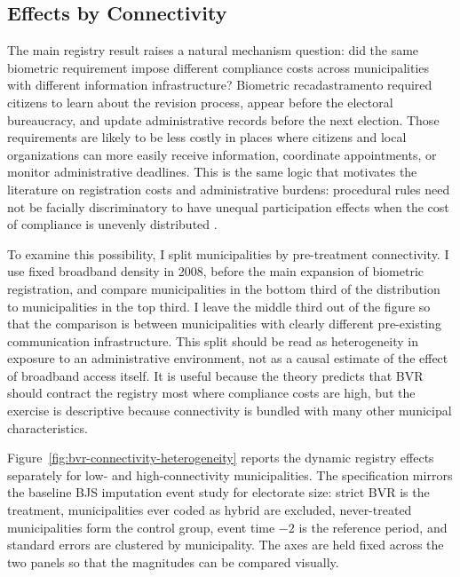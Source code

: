 \subsection{Effects by Connectivity}
\label{ssec:connectivity-heterogeneity}

The main registry result raises a natural mechanism question: did the same biometric requirement impose different compliance costs across municipalities with different information infrastructure? Biometric recadastramento required citizens to learn about the revision process, appear before the electoral bureaucracy, and update administrative records before the next election. Those requirements are likely to be less costly in places where citizens and local organizations can more easily receive information, coordinate appointments, or monitor administrative deadlines. This is the same logic that motivates the literature on registration costs and administrative burdens: procedural rules need not be facially discriminatory to have unequal participation effects when the cost of compliance is unevenly distributed \citep{Rosenstone1978TheEffectRegistra, Ansolabehere2005TheIntroducVoter, Herd2018}.

To examine this possibility, I split municipalities by pre-treatment connectivity. I use fixed broadband density in 2008, before the main expansion of biometric registration, and compare municipalities in the bottom third of the distribution to municipalities in the top third. I leave the middle third out of the figure so that the comparison is between municipalities with clearly different pre-existing communication infrastructure. This split should be read as heterogeneity in exposure to an administrative environment, not as a causal estimate of the effect of broadband access itself. It is useful because the theory predicts that BVR should contract the registry most where compliance costs are high, but the exercise is descriptive because connectivity is bundled with many other municipal characteristics.

Figure~\ref{fig:bvr-connectivity-heterogeneity} reports the dynamic registry effects separately for low- and high-connectivity municipalities. The specification mirrors the baseline BJS imputation event study for electorate size: strict BVR is the treatment, municipalities ever coded as hybrid are excluded, never-treated municipalities form the control group, event time $-2$ is the reference period, and standard errors are clustered by municipality. The axes are held fixed across the two panels so that the magnitudes can be compared visually.

